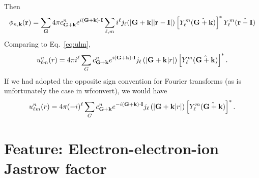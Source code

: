 Then
\begin{equation}
\phi_{n,\mathbf{k}}(\mathbf{r}) =  \sum_{\mathbf{G}} 4\pi c_{\mathbf{G}+\mathbf{k}}^n
e^{i(\mathbf{G}+\mathbf{k})\cdot\mathbf{I}} \sum_{\ell,m}
  i^\ell j_\ell(|\mathbf{G} +\mathbf{k}||\mathbf{r}-\mathbf{I}|)
  \left[Y_\ell^m(\hat{\mathbf{G}+\mathbf{k}})\right]^*
Y_\ell^m(\hat{\mathbf{r} - \mathbf{I}})
\end{equation}
Comparing to Eq.~\ref{eq:ulm},
\begin{equation}
u_{\ell m}^n(r) = 4\pi i^\ell \sum_G c_{\mathbf{G}+\mathbf{k}}^n e^{i(\mathbf{G}+\mathbf{k})\cdot\mathbf{I}}  j_\ell\left(|\mathbf{G} + \mathbf{k}|r|\right)
\left[Y_\ell^m(\hat{\mathbf{G} + \mathbf{k}})\right]^*.
\end{equation}
If we had adopted the opposite sign convention for Fourier transforms
(as is unfortunately the case in wfconvert), we would have
\begin{equation}
u_{\ell m}^n(r) = 4\pi (-i)^\ell \sum_G c_{\mathbf{G}+\mathbf{k}}^n e^{-i(\mathbf{G}+\mathbf{k})\cdot\mathbf{I}}  j_\ell\left(|\mathbf{G} + \mathbf{k}|r|\right)
\left[Y_\ell^m(\hat{\mathbf{G} + \mathbf{k}})\right]^*.
\end{equation}




\newpage
\section{Feature: Electron-electron-ion Jastrow factor}


